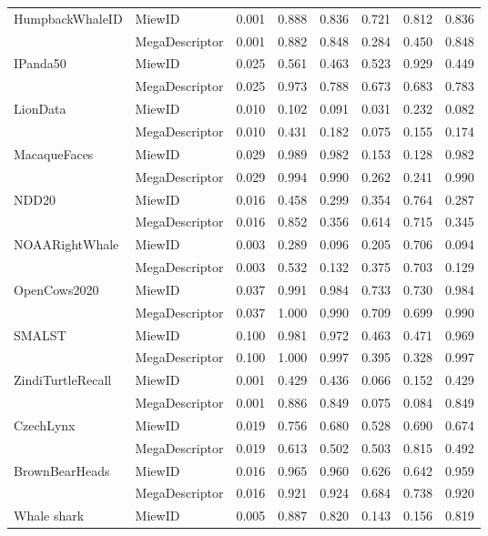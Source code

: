 \begin{table}[!t]
\begin{tabular}[t]{@{}llrrrrrr@{}}
\midrule
HumpbackWhaleID & MiewID & 0.001 & 0.888 & 0.836 & 0.721 & 0.812 & 0.836 \\
 & MegaDescriptor & 0.001 & 0.882 & 0.848 & 0.284 & 0.450 & 0.848 \\
\midrule
IPanda50 & MiewID & 0.025 & 0.561 & 0.463 & 0.523 & 0.929 & 0.449 \\
 & MegaDescriptor & 0.025 & 0.973 & 0.788 & 0.673 & 0.683 & 0.783 \\
\midrule
LionData & MiewID & 0.010 & 0.102 & 0.091 & 0.031 & 0.232 & 0.082 \\
 & MegaDescriptor & 0.010 & 0.431 & 0.182 & 0.075 & 0.155 & 0.174 \\
\midrule
MacaqueFaces & MiewID & 0.029 & 0.989 & 0.982 & 0.153 & 0.128 & 0.982 \\
 & MegaDescriptor & 0.029 & 0.994 & 0.990 & 0.262 & 0.241 & 0.990 \\
\midrule
NDD20 & MiewID & 0.016 & 0.458 & 0.299 & 0.354 & 0.764 & 0.287 \\
 & MegaDescriptor & 0.016 & 0.852 & 0.356 & 0.614 & 0.715 & 0.345 \\
\midrule
NOAARightWhale & MiewID & 0.003 & 0.289 & 0.096 & 0.205 & 0.706 & 0.094 \\
 & MegaDescriptor & 0.003 & 0.532 & 0.132 & 0.375 & 0.703 & 0.129 \\
\midrule
OpenCows2020 & MiewID & 0.037 & 0.991 & 0.984 & 0.733 & 0.730 & 0.984 \\
 & MegaDescriptor & 0.037 & 1.000 & 0.990 & 0.709 & 0.699 & 0.990 \\
\midrule
SMALST & MiewID & 0.100 & 0.981 & 0.972 & 0.463 & 0.471 & 0.969 \\
 & MegaDescriptor & 0.100 & 1.000 & 0.997 & 0.395 & 0.328 & 0.997 \\
\midrule
ZindiTurtleRecall & MiewID & 0.001 & 0.429 & 0.436 & 0.066 & 0.152 & 0.429 \\
 & MegaDescriptor & 0.001 & 0.886 & 0.849 & 0.075 & 0.084 & 0.849 \\
\midrule
CzechLynx & MiewID & 0.019 & 0.756 & 0.680 & 0.528 & 0.690 & 0.674 \\
 & MegaDescriptor & 0.019 & 0.613 & 0.502 & 0.503 & 0.815 & 0.492 \\
\midrule
BrownBearHeads & MiewID & 0.016 & 0.965 & 0.960 & 0.626 & 0.642 & 0.959 \\
 & MegaDescriptor & 0.016 & 0.921 & 0.924 & 0.684 & 0.738 & 0.920 \\
\midrule
Whale shark & MiewID & 0.005 & 0.887 & 0.820 & 0.143 & 0.156 & 0.819 \\

\end{tabular}
\end{table}
